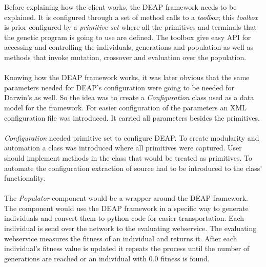 Before explaining how the client works, the DEAP framework needs to be explained. It is configured through a set of method calls
to a \textit{toolbox}; this \textit{toolbox} is prior configured by a \textit{primitive set} where all the primitives and 
terminals that the genetic program is going to use are defined. The toolbox give easy API for accessing and controlling the individuals,
generations and population as well as methods that invoke mutation, crossover and evaluation over the population.
\paragraph{}
Knowing how the DEAP framework works, it was later obvious that the same parameters needed for DEAP's configuration
were going to be needed for Darwin's as well. So the idea was to create a \textit{Configuration} class used as a data
model for the framework. For easier configuration of the parameters an XML configuration file was introduced. It carried
all parameters besides the primitives.
\paragraph{}
\textit{Configuration} needed primitive set to configure DEAP. To create modularity and automation a class was introduced
where all primitives were captured. User should implement methods in the class that would be treated as primitives. To
automate the configuration extraction of source had to be introduced to the class' functionality.
\paragraph{}
The \textit{Populator} component would be a wrapper around the DEAP framework. 
The component would use the DEAP framework in a specific way to generate individuals and convert them to python code for easier transportation.
 Each individual is send over the network to the evaluating webservice. The evaluating webservice measures the fitness
of an individual and returns it. After each individual's fitness value is updated it
repeats the process until the number of generations are reached or an individual with 0.0 fitness is found.


